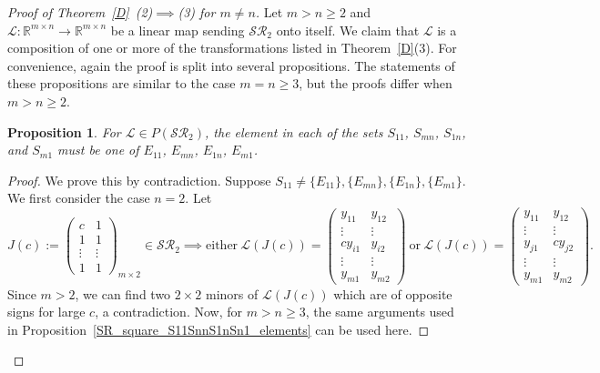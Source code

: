\documentclass[11pt,reqno]{amsart}
\theoremstyle{plain}
\newtheorem{prop}[theorem]{Proposition}
\theoremstyle{definition}
\numberwithin{equation}{section}
\begin{document}
\begin{proof}[Proof of Theorem~\ref{D}~(2)$\implies$(3) for $m\neq n$] 
	Let $m>n\geq2$ and $\mathcal{L}:\mathbb{R}^{m\times n}\to\mathbb{R}^{m\times n}$ be a linear map sending $\mathcal{SR}_2$ onto itself. We claim that $\mathcal{L}$ is a composition of one or more of the transformations listed in Theorem~\ref{D}(3). For convenience, again the proof is split into several propositions. The statements of these propositions are similar to the case $m=n\geq3$, but the proofs differ when $m>n\geq2$.
	
 \begin{prop}\label{SR_rectangle_S11SmnS1nSm1_elements}
		For $\mathcal{L}\in P(\mathcal{SR}_2)$, the element in each of the sets $S_{11}$, $S_{mn}$, $S_{1n}$, and $S_{m1}$ must be one of $E_{11}$, $E_{mn}$, $E_{1n}$, $E_{m1}$.
	\end{prop}
	
	\begin{proof}
		We prove this by contradiction. Suppose $S_{11}\neq\{E_{11}\}, \{E_{mn}\},	\{E_{1n}\}, \{E_{m1}\}$. We first consider the case $n=2$. Let
		\[J(c):=\begin{pmatrix}
			c & 1 \\
			1 & 1 \\
			\vdots & \vdots \\
			1 & 1
		\end{pmatrix}_{m\times2}\in\mathcal{SR}_2\implies\text{either}~ \mathcal{L}(J(c))=\begin{pmatrix}
			y_{11} & y_{12} \\
			\vdots & \vdots \\
			cy_{i1} & y_{i2} \\
			\vdots & \vdots \\
			y_{m1} & y_{m2}
		\end{pmatrix}~\text{or}~ \mathcal{L}(J(c))=\begin{pmatrix}
			y_{11} & y_{12} \\
			\vdots & \vdots \\
			y_{j1} & cy_{j2} \\
			\vdots & \vdots \\
			y_{m1} & y_{m2}
		\end{pmatrix}.\]
		Since $m>2$, we can find two $2\times2$ minors of $\mathcal{L}(J(c))$ which are of opposite signs for large $c$, a contradiction. Now, for $m>n\geq3$, the same arguments used in Proposition~\ref{SR_square_S11SnnS1nSn1_elements} can be used here.
		

\end{proof}
\end{proof}
\end{document}
